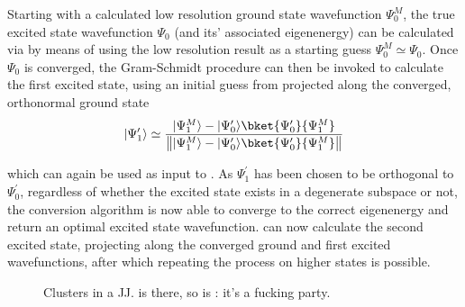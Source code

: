 Starting with a  calculated low resolution ground state wavefunction $\Psi_0^{M}$, the true excited state wavefunction $\Psi_0$ (and its' associated eigenenergy) can be calculated via  by means of using the low resolution result as a starting guess $\Psi_0^{M} \simeq \Psi_0$.
Once $\Psi_0$ is converged, the Gram-Schmidt procedure can then be invoked to calculate the first excited state, using an initial guess from  projected along the converged, orthonormal ground state
\begin{equation}
    \ket{\Psi^\prime_1} \simeq \frac{\ket{\Psi^M_1} - \ket{\Psi^\prime_0}\bket{\Psi^\prime_0}{\Psi^M_1}}{\norm[\big]{\ket{\Psi^M_1} - \ket{\Psi^\prime_0}\bket{\Psi^\prime_0}{\Psi^M_1}}}
\end{equation}

which can again be used as input to .
As $\Psi^\prime_1$ has been chosen to be orthogonal to $\Psi^\prime_0$, regardless of whether the excited state exists in a degenerate subspace or not, the conversion algorithm is now able to converge to the correct eigenenergy and return an optimal excited state wavefunction.
 can now calculate the second excited state, projecting along the converged ground and first excited wavefunctions, after which repeating the process  on higher states is possible.


\begin{figure}[htp]
\resizebox{\textwidth}{!}{}
  \caption[JJ TLS]{\label{fig:tlsinjj}Clusters in a JJ.  is there, so is : it's a fucking party.}
\end{figure}